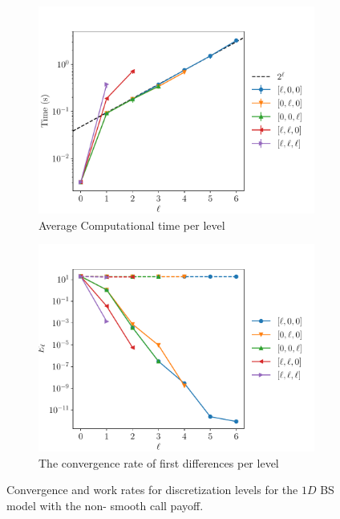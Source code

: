 \documentclass[11pt]{article}
\begin{document}
\begin{figure}[!h]
	\centering
	\begin{subfigure}{.5\textwidth}
		\centering
		\includegraphics[width=0.95\linewidth]{./figures/1D_BS_4_steps_non_smooth_richardson_coarser/level_work.pdf}
		\caption{Average Computational time per level}
		\label{fig:misc_1D_BS_non_smooth_4steps_sub3}
	\end{subfigure}%
	\begin{subfigure}{.5\textwidth}
		\centering
		\includegraphics[width=0.95\linewidth]{./figures/1D_BS_4_steps_non_smooth_richardson_coarser/levels_error_rate.pdf}
		\caption{ The convergence rate of first differences per level}
		\label{fig:misc_1D_BS_non_smooth_4steps_sub4}
	\end{subfigure}%
	\caption{Convergence and work rates for discretization levels for the $1D$ BS model with the non- smooth call payoff.}
	\label{fig:misc_1D_BS_4teps_2}
\end{figure}
\end{document}
